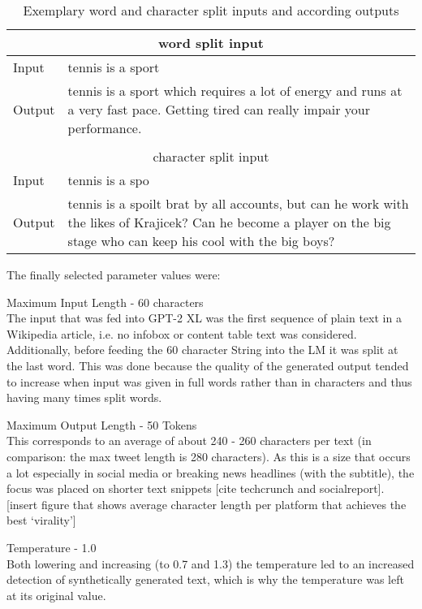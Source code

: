 \begin{table}
\centering
\begin{tabular}{ | l | p{14cm} | }
  \multicolumn{2}{c}{word split input} \\
  \hline			
  Input & tennis is a sport \\ \hline
  Output & tennis is a sport which requires a lot of energy and runs at a very fast pace. Getting tired can really impair your performance. \\
  \hline
  \multicolumn{2}{c}{} \\
  \multicolumn{2}{c}{character split input} \\
  \hline
  Input & tennis is a spo \\ \hline
  Output & tennis is a spoilt brat by all accounts, but can he work with the likes of Krajicek? Can he become a player on the big stage who can keep his cool with the big boys? \\
  \hline
\end{tabular}
\caption{Exemplary word and character split inputs and according outputs} \label{tab:word_vs_char_split}
\end{table}

The finally selected parameter values were:

Maximum Input Length - 60 characters \\
The input that was fed into GPT-2 XL was the first sequence of plain text in a Wikipedia article, i.e. no infobox or content table text was 
considered. Additionally, before feeding the 60 character String into the LM it was split at the last word. This was done because the quality 
of the generated output tended to increase when input was given in full words rather than in characters and thus having many times split words.

Maximum Output Length - 50 Tokens \\
This corresponds to an average of about 240 - 260 characters per text (in comparison: the max tweet length is 280 characters). As this is a 
size that occurs a lot especially in social media or breaking news headlines (with the subtitle), the focus was placed on shorter text 
snippets [cite techcrunch and socialreport]. 
[insert figure that shows average character length per platform that achieves the best ‘virality’]

Temperature - 1.0 \\
Both lowering and increasing (to 0.7 and 1.3) the temperature led to an increased detection of synthetically generated text, which is why 
the temperature was left at its original value.

